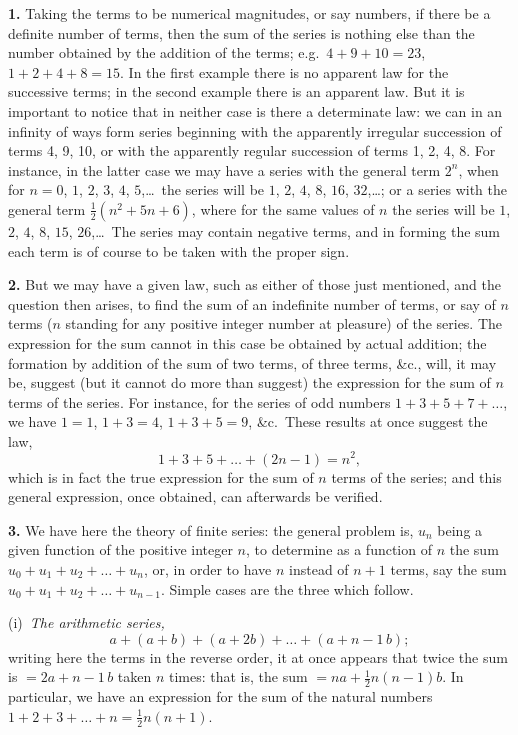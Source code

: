 \documentclass[11pt,a4paper]{book}
\begin{document}
\textbf{1.}\quad
Taking the terms to be numerical magnitudes, or say numbers, if there be a definite number of terms, then the sum of the series is nothing else than the number obtained by the addition of the terms; e.g.\ $4 + 9 + 10 = 23$, $1 + 2 + 4 + 8 = 15$. In the first example there is no apparent law for the successive terms; in the second example there is an apparent law. But it is important to notice that in neither case is there a determinate law: we can in an infinity of ways form series beginning with the apparently irregular succession of terms 4, 9, 10, or with the apparently regular succession of terms 1, 2, 4, 8. For instance, in the latter case we may have a series with the general term $2^{n}$, when for $n = 0$, $1$, $2$, $3$, $4$, $5$,\ldots\ the series will be $1$, $2$, $4$, $8$, $16$, $32$,\ldots; or a series with the general term $\frac{1}{2}(n^{2} + 5n + 6)$, where for the same values of $n$ the series will be $1$, $2$, $4$, $8$, $15$, $26$,\ldots\ The series may contain negative terms, and in forming the sum each term is of course to be taken with the proper sign.

\textbf{2.}\quad
But we may have a given law, such as either of those just mentioned, and the question then arises, to find the sum of an indefinite number of terms, or say of $n$ terms ($n$ standing for any positive integer number at pleasure) of the series. The expression for the sum cannot in this case be obtained by actual addition; the formation by addition of the sum of two terms, of three terms, \&c., will, it may be, suggest (but it cannot do more than suggest) the expression for the sum of $n$ terms of the series. For instance, for the series of odd numbers $1 + 3 + 5 + 7 + \ldots$, we have $1 = 1$, $1 + 3 = 4$, $1 + 3 + 5 = 9$, \&c.\ These results at once suggest the law,
\[
1 + 3 + 5 + \ldots + (2n - 1) = n^{2},
\]
which is in fact the true expression for the sum of $n$ terms of the series; and this general expression, once obtained, can afterwards be verified.

\textbf{3.}\quad
We have here the theory of finite series: the general problem is, $u_{n}$ being a given function of the positive integer $n$, to determine as a function of $n$ the sum $u_{0} + u_{1} + u_{2} + \ldots + u_{n}$, or, in order to have $n$ instead of $n + 1$ terms, say the sum $u_{0} + u_{1} + u_{2} + \ldots + u_{n-1}$. Simple cases are the three which follow.

(i)~\textit{The arithmetic series,}
\[
a + (a + b) + (a + 2b) + \ldots + (a + n - 1\, b);
\]
writing here the terms in the reverse order, it at once appears that twice the sum is $= 2a + n - 1\, b$ taken $n$ times: that is, the sum $= na + \frac{1}{2}n(n - 1)b$. In particular, we have an expression for the sum of the natural numbers $1 + 2 + 3 + \ldots + n = \frac{1}{2}n(n + 1)$.
\end{document}
